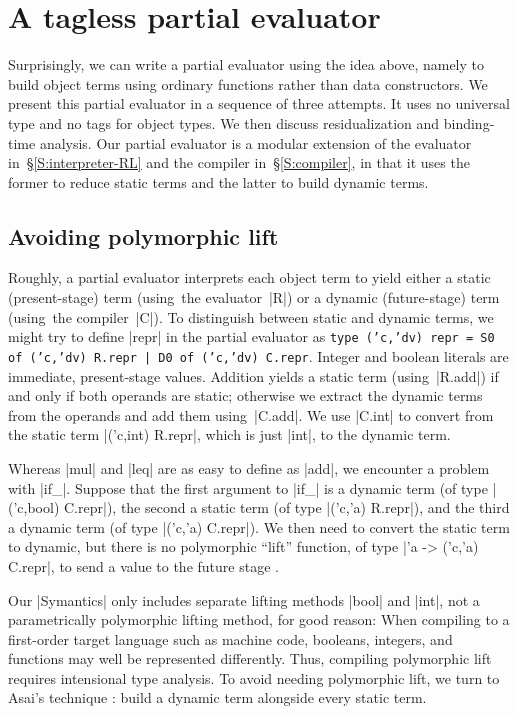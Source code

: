 \section{A tagless partial evaluator}\label{PE}
Surprisingly, we can write a partial evaluator using the idea above,
namely to build object terms using ordinary functions rather than data
constructors.  We present this partial evaluator in a sequence of three
attempts. It uses no universal type and no tags
for object types.  We then discuss residualization and binding-time
analysis.  Our partial evaluator is a modular extension of the evaluator
in~\S\ref{S:interpreter-RL} and the compiler in~\S\ref{S:compiler}, in
that it uses the former to reduce static terms and the latter to build
dynamic terms.

\subsection{Avoiding polymorphic lift}
\label{S:PE-lift}

Roughly, a partial evaluator interprets each object term to yield either
a static (present-stage) term (using\ifshort\else\ the evaluator\fi~|R|) or
a dynamic (future-stage) term (using\ifshort\else\ the
compiler\fi~|C|). To
distinguish between static and dynamic terms, we might try to define
|repr| in the partial evaluator as
\texttt{type ('c,'dv)\,repr 
	= S0 of ('c,'dv)\,R.repr~}\Verb+|+\texttt{~D0 of ('c,'dv)\,C.repr}.
Integer and boolean literals are immediate, present-stage
values. Addition yields a static term (using~|R.add|) if and only 
if both operands are static; otherwise we extract the dynamic terms 
from the operands and add them using~|C.add|. We use |C.int| to
convert from the static term |('c,int) R.repr|, which is just |int|,
to the dynamic term.

Whereas |mul| and |leq| are as easy to define as |add|, we encounter
a problem with |if_|.  Suppose that the first argument to |if_| is a dynamic term
(of type |('c,bool) C.repr|), the second a static term 
(of type |('c,'a) R.repr|), and the third a
dynamic term (of type |('c,'a) C.repr|). We then need to convert
the static term to dynamic, but there is no polymorphic ``lift''
function, of type |'a -> ('c,'a) C.repr|, to send a value to the future stage
\citep{xi-guarded,WalidPOPL03}.

Our |Symantics| only includes separate lifting methods |bool| and
|int|, not a parametrically polymorphic lifting method, for good reason:
When compiling to a first-order target language such as machine code,
booleans, integers, and functions may well be represented differently.
Thus, compiling polymorphic lift requires intensional type
analysis.  To avoid needing polymorphic lift, we turn to
Asai's technique \citep{asai-binding-time,sumii-hybrid}:
build a dynamic term
alongside every static term.

